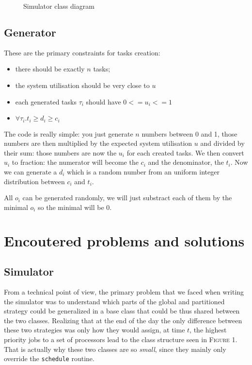 \documentclass[a4paper]{article}
\begin{document}
\begin{figure}[H]
  \centering
  \caption{Simulator class diagram}
\end{figure}


\subsection{Generator}
\label{gendesc}
These are the primary constraints for tasks creation:
\begin{itemize}
  \item there should be exactly $n$ tasks;
  \item the system utilisation should be very close to $u$
  \item each generated tasks $\tau_i$ should have $0 <= u_i <= 1$
  \item $\forall \tau_i. t_i \geq d_i \geq c_i$
\end{itemize}

The code is really simple: you just generate $n$ numbers between 0 and 1, those numbers are then multiplied by the expected system utilisation $u$ and divided by their sum: those numbers are now the $u_i$ for each created tasks.
We then convert $u_i$ to fraction: the numerator will become the $c_i$ and the denominator, the $t_i$. Now we can generate a $d_i$ which is a random number from an uniform integer distribution between $c_i$ and $t_i$.

All $o_i$ can be generated randomly, we will just substract each of them by the minimal $o_i$ so the minimal will be 0.


\section{Encoutered problems and solutions}

\subsection{Simulator}
From a technical point of view, the primary problem that we faced when writing the simulator was to understand which parts of the global and partitioned strategy could be generalized in a base class that could be thus shared between the two classes. Realizing that at the end of the day the only difference between these two strategies was only how they would assign, at time $t$, the highest priority jobs to a set of processors lead to the class structure seen in \textsc{Figure 1}. That is actually why these two classes are so \textit{small}, since they mainly only override the \texttt{schedule} routine.
\end{document}
